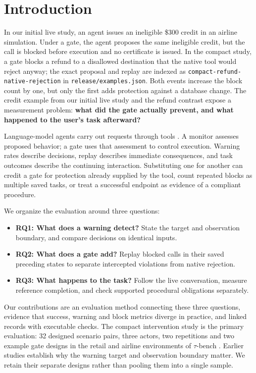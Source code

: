 \section{Introduction}\label{introduction}

In our initial live study, an agent issues an ineligible \$300 credit in
an airline simulation. Under a gate, the agent proposes the same
ineligible credit, but the call is blocked before execution and no
certificate is issued. In the compact study, a gate blocks a refund to a
disallowed destination that the native tool would reject anyway; the
exact proposal and replay are indexed as
\texttt{compact-refund-native-rejection} in
\texttt{release/examples.json}. Both events increase the block count by
one, but only the first adds protection against a database change. The
credit example from our initial live study and the refund contrast
expose a measurement problem: \textbf{what did the gate actually
prevent, and what happened to the user's task afterward?}

Language-model agents carry out requests through tools
\citep{yao2023react, schick2023toolformer}. A monitor assesses proposed
behavior; a gate uses that assessment to control execution. Warning
rates describe decisions, replay describes immediate consequences, and
task outcomes describe the continuing interaction. Substituting one for
another can credit a gate for protection already supplied by the tool,
count repeated blocks as multiple saved tasks, or treat a successful
endpoint as evidence of a compliant procedure.

We organize the evaluation around three questions:

\begin{itemize}
\tightlist
\item
  \textbf{RQ1: What does a warning detect?} State the target and
  observation boundary, and compare decisions on identical inputs.
\item
  \textbf{RQ2: What does a gate add?} Replay blocked calls in their
  saved preceding states to separate intercepted violations from native
  rejection.
\item
  \textbf{RQ3: What happens to the task?} Follow the live conversation,
  measure reference completion, and check supported procedural
  obligations separately.
\end{itemize}

Our contributions are an evaluation method connecting these three
questions, evidence that success, warning and block metrics diverge in
practice, and linked records with executable checks. The compact
intervention study is the primary evaluation: 32 designed scenario
pairs, three actors, two repetitions and two example gate designs in the
retail and airline environments of \(\tau\)-bench
\citep{yao2024tau, barres2025tau2}. Earlier studies establish why the
warning target and observation boundary matter. We retain their separate
designs rather than pooling them into a single sample.

